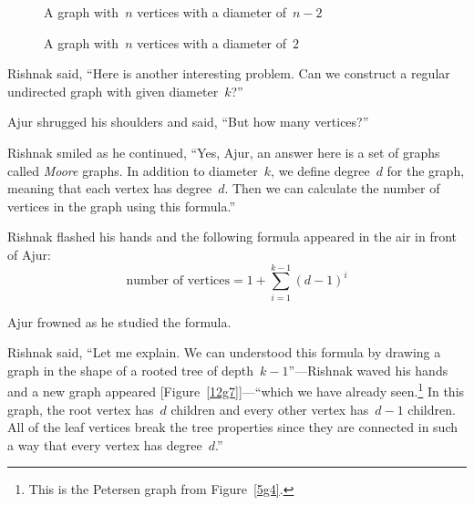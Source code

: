 \begin{figure}
\begin{center}
\caption{A graph with~$n$ vertices with a diameter of~$n-2$}\label{12g5}
\end{center}
\end{figure}
\begin{figure}
 \begin{center}
\caption{A graph with~$n$ vertices with a diameter of~$2$}\label{12g6}
\end{center}
\end{figure}

Rishnak said, ``Here is another interesting problem. Can we construct a regular undirected graph with given diameter~$k$?''

Ajur shrugged his shoulders and said, ``But how many vertices?''

Rishnak smiled as he continued, ``Yes, Ajur, an answer here is a set of graphs called \textit{Moore} graphs. In addition to diameter~$k$, we define degree~$d$ for the graph, meaning that each vertex has degree~$d$. Then we can calculate the number of vertices in the graph using this formula.''

Rishnak flashed his hands and the following formula appeared in the air in front of Ajur:
$$\text{number of vertices} = 1+\sum_{i=1}^{k-1} (d-1)^i$$

Ajur frowned as he studied the formula.

Rishnak said, ``Let me explain. We can understood this formula by drawing a graph in the shape of a rooted tree of depth~$k-1$''---Rishnak waved his hands and a new graph appeared [Figure~\ref{12g7}]---``which we have already seen.\footnote{This is the Petersen graph from Figure~\ref{5g4}.} In this graph, the root vertex has~$d$ children and every other vertex has~$d-1$ children. All of the leaf vertices break the tree properties since they are connected in such a way that every vertex has degree~$d$.''

